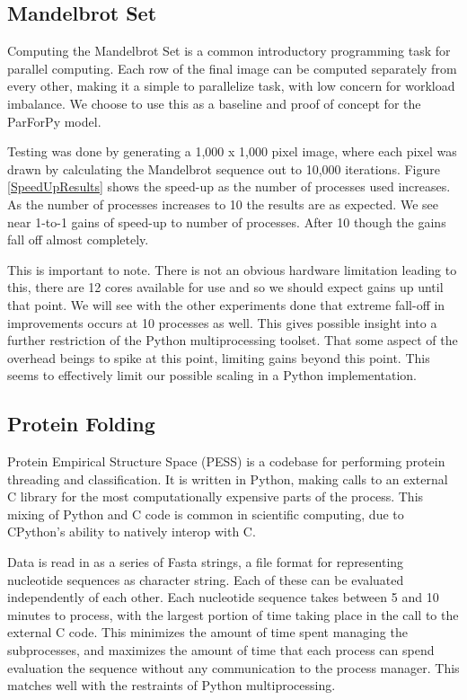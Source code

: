 \documentclass[conference]{IEEEtran}
\begin{document}
\subsection{Mandelbrot Set}

Computing the Mandelbrot Set is a common introductory programming task for parallel
computing.
Each row of the final image can be computed separately from every other,
making it a simple to parallelize task, with low concern for workload imbalance.
We choose to use this as a baseline and proof of concept for the ParForPy model.

Testing was done by generating a 1,000 x 1,000 pixel image, where each pixel was drawn by
calculating the Mandelbrot sequence out to 10,000 iterations.
Figure \ref{SpeedUpResults} shows the speed-up as the number of processes used increases.
As the number of processes increases to 10 the results are as expected. 
We see near 1-to-1 gains of speed-up to number of processes.
After 10 though the gains fall off almost completely.

This is important to note. 
There is not an obvious hardware limitation leading to this, there are 12 cores available for use and so we should expect gains up until that point. 
We will see with the other experiments done that extreme fall-off in improvements occurs 
at 10 processes as well.
This gives possible insight into a further restriction of the Python multiprocessing toolset. 
That some aspect of the overhead beings to spike at this point, limiting gains beyond this point.
This seems to effectively limit our possible scaling in a Python implementation.

\subsection{Protein Folding}

Protein Empirical Structure Space (PESS) is a codebase for performing protein
threading and classification\cite{middleton2016complete}. 
It is written in Python, making calls to an external C library for the
most computationally expensive parts of the process.
This mixing of Python and C code is common in scientific computing, due to CPython's 
ability to natively interop with C\cite{pythonCInterop}.

Data is read in as a series of Fasta strings, a file format for representing 
nucleotide sequences as character string.
Each of these can be evaluated independently of each other.
Each nucleotide sequence takes between 5 and 10 minutes to process, with
the largest portion of time taking place in the call to the external C code.
This minimizes the amount of time spent managing the subprocesses, and maximizes
the amount of time that each process can spend evaluation the sequence without 
any communication to the process manager.
This matches well with the restraints of Python multiprocessing.
\end{document}
